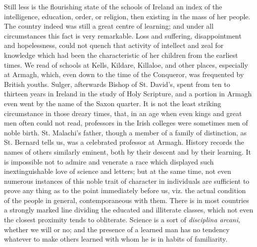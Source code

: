 Still less is the flourishing
state of the schools of Ireland an index of the intelligence,
education, order, or religion, then existing in the mass of her
people. The country indeed was still a great centre of learning; and
under all circumstances this fact is very remarkable. Loss and
suffering, disappointment and hopelessness, could not quench that
activity of intellect and zeal for knowledge which had been the
characteristic of her children from the earliest times. We read of
schools at Kells, Kildare, Killaloe, and other places, especially at
Armagh, which, even down to the time of the Conqueror, was frequented
by British youths. Sulger, afterwards Bishop of St. David's, spent
from ten to thirteen years in Ireland in the study of Holy Scripture,
and a portion in Armagh even went by the name of the Saxon quarter. It
is not the least striking circumstance in those dreary times, that, in
an age when even kings and great men often could not read, professors
in the Irish colleges were sometimes men of noble birth. St. Malachi's
father, though a member of a family of distinction, as St.
Bernard tells us, was a celebrated professor at Armagh. History
records the names of others similarly eminent, both by their descent
and by their learning. It is impossible not to admire and venerate a
race which displayed such inextinguishable love of science and
letters; but at the same time, not even numerous instances of this
noble trait of character in individuals are sufficient to prove any
thing as to the point immediately before us, viz. the actual condition
of the people in general, contemporaneous with them. There is in most
countries a strongly marked line dividing the educated and illiterate
classes, which not even the closest proximity tends to obliterate.
Science is a sort of \emph{disciplina arcani}, whether we will or no;
and the presence of a learned man has no tendency whatever to make
others learned with whom he is in habits of familiarity.


